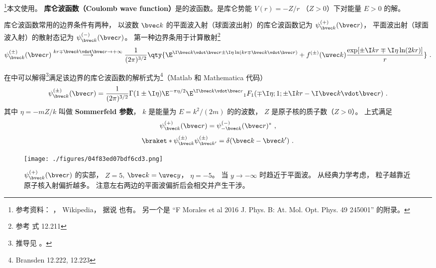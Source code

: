 

\footnote{参考资料： \cite{Bransden}， Wikipedia， 据说 \cite{Merzbacher} 也有。 另一个是 “F Morales et al 2016 J. Phys. B: At. Mol. Opt. Phys. 49 245001” 的附录。}本文使用。 \textbf{库仑波函数（Coulomb wave function）}是的波函数。是库仑势能 $V(r) = -Z/r$ （$Z > 0$）下对能量 $E > 0$ 的解。

库仑波函数常用的边界条件有两种， 以波数 $\bvec k$ 的平面波入射（球面波出射）的库仑波函数记为 $\psi_{\bvec k}^{(+)}(\bvec r)$， 平面波出射（球面波入射）的散射态记为 $\psi_{\bvec k}^{(-)}(\bvec r)$。 第一种边界条用于计算散射\footnote{参考\cite{Bransden} 式 12.211}
\begin{equation}\label{eq_CulmWf_4}
\psi_{\bvec k}^{(\pm)}(\bvec r) \overset{kr \mp \bvec k \vdot\bvec r \to +\infty}{\longrightarrow} \frac{1}{(2\pi)^{3/2}} \qty{\E^{\I\bvec k\vdot\bvec r \pm \I\eta\ln (kr \mp \bvec k \vdot\bvec r)}
+ f^{(\pm)}(\uvec k) \frac{\exp[\pm\I kr \mp \I\eta \ln(2kr)]}{r}}~.
\end{equation}

在中可以解得\footnote{推导见 \cite{Bransden}。}满足该边界的库仑波函数的解析式为\footnote{Bransden\cite{Bransden} 12.222, 12.223}（Matlab 和 Mathematica 代码）
\begin{equation}\label{eq_CulmWf_7}
\psi_{\bvec k}^{(\pm)}(\bvec r) = \frac{1}{(2\pi)^{3/2}} \Gamma(1\pm \I\eta)\E^{-\pi\eta/2} \E^{\I\bvec k\vdot\bvec r} {_1F_1}(\mp\I\eta; 1; \pm\I kr - \I \bvec k\vdot \bvec r)~.
\end{equation}
其中 $\eta = -mZ/k$ 叫做 \textbf{Sommerfeld 参数}， $k$ 是能量为 $E = k^2/(2m)$ 的的波数， $Z$ 是原子核的质子数（$Z > 0$）。 上式满足
\begin{equation}
\psi_{\bvec k}^{(+)}(\bvec r) = \psi_{-\bvec k}^{(-)}(\bvec r)^*~,
\end{equation}
\begin{equation}
\braket*{\psi_{\bvec k}^{(\pm)}}{\psi_{\bvec k'}^{(\pm)}} = \delta(\bvec k - \bvec k')~.
\end{equation}

\begin{figure}[ht]
\centering
\texttt{[image: ./figures/04f83ed07bdf6cd3.png]} %
\caption{$\psi_{\bvec k}^{(+)}(\bvec r)$ 的实部， $Z = 5$, $\bvec k = \uvec y$， $\eta = -5$。 当 $y \to -\infty$ 时趋近于平面波。 从经典力学考虑， 粒子越靠近原子核入射偏折越多。 注意左右两边的平面波偏折后会相交并产生干涉。} \label{fig_CulmWf_2}
\end{figure}

